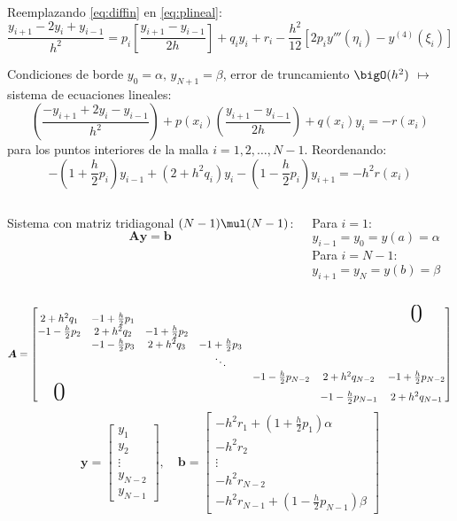 \documentclass[9pt, aspectratio=169]{beamer}
\begin{document}
\begin{frame}
Reemplazando \eqref{eq:diffin} en \eqref{eq:plineal}:
\[
\frac{y_{i+1} - 2 y_i + y_{i-1}}{h^2} = p_{i} \left[\frac{y_{i+1} - y_{i-1}}{2h}\right] + q_i y_i + r_i - \frac{h^2}{12}[2 p_i y'''(\eta_i) - y^{(4)}(\xi_i)] \]
\pause

Condiciones de borde $y_0 = \alpha, \, y_{N + 1} = \beta$, error de truncamiento $\bigO(h^2)$ $\mapsto$ sistema de ecuaciones lineales:
\[ \left(\frac{-y_{i+1} + 2 y_i - y_{i-1}}{h^2}\right) + p(x_i) \left(\frac{y_{i+1} - y_{i-1}}{2 h}\right) + q(x_i) y_i = -r(x_i) \]
para los puntos interiores de la malla $i = 1, 2, \ldots, N - 1$. Reordenando:
\[ -\left(1 + \frac{h}{2}p_i\right) y_{i-1} + \left(2 + h^2 q_i \right) y_i - \left(1 - \frac{h}{2} p_i \right) y_{i+1} = -h^2 r(x_i) \]
\begin{columns}[t]
\cx
Sistema con matriz tridiagonal $(N - 1) \mul (N - 1)$:
\[ \bm{A} \bm{y} = \bm{b} \]

\cx
Para $i = 1$: 
\[ y_{i-1} = y_0 = y(a) = \alpha \]
Para $i = N-1$:
\[ y_{i + 1} = y_N = y(b) = \beta \]
\end{columns}
\end{frame}

\begin{frame}
    \[ \bm{A} = \begin{bmatrix}
        2 + h^2 q_1 & -1 + \frac{h}{2} p_1 & & & & & \text{\Huge 0} \\
        -1-\frac{h}{2} p_2 & 2 + h^2 q_2 & -1 +\frac{h}{2} p_2 & & & \\
                              & -1-\frac{h}{2} p_3 & 2 + h^2 q_3 & -1 +\frac{h}{2} p_3  & & \\
                              & & & \ddots &  & & \\
                              & & && -1-\frac{h}{2} p_{N-2} & 2 + h^2 q_{N-2} & -1 +\frac{h}{2} p_{N-2} \\
        \text{\Huge 0}              & & & & & -1 - \frac{h}{2} p_{N-1} & 2 + h^2 q_{N-1}
    \end{bmatrix} \]
    \[ \bm{y} = \begin{bmatrix} y_1 \\ y_2 \\ \vdots \\ y_{N-2} \\ y_{N-1} \end{bmatrix}, \quad 
    \bm{b} = \begin{bmatrix} 
        -h^2 r_1 + \left(1 + \frac{h}{2} p_1 \right) \alpha \\
        -h^2 r_2 \\
        \vdots \\
    -h^2 r_{N-2} \\
    -h^2 r_{N-1} + \left(1 - \frac{h}{2} p_{N-1} \right) \beta
\end{bmatrix} 
    \]
\end{frame}
\end{document}
